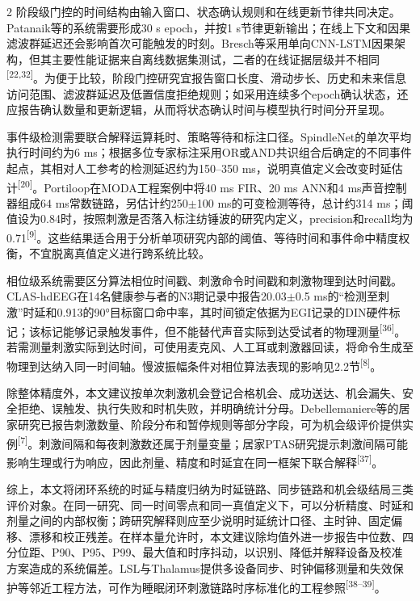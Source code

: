 \documentclass[UTF8,zihao=5,fontset=none]{ctexart}
\newcommand{\refcite}[1]{\nolinebreak[4]\textsuperscript{[#1]}}
\begin{document}
\begin{multicols}{2}
阶段级门控的时间结构由输入窗口、状态确认规则和在线更新节律共同决定。Patanaik等的系统需要形成30 s epoch，并按1 s节律更新输出；在线上下文和因果滤波群延迟还会影响首次可能触发的时刻。Bresch等采用单向CNN-LSTM因果架构，但其主要性能证据来自离线数据集测试，二者的在线证据层级并不相同\refcite{22,32}。为便于比较，阶段门控研究宜报告窗口长度、滑动步长、历史和未来信息访问范围、滤波群延迟及低置信度拒绝规则；如采用连续多个epoch确认状态，还应报告确认数量和更新逻辑，从而将状态确认时间与模型执行时间分开呈现。\par

事件级检测需要联合解释运算耗时、策略等待和标注口径。SpindleNet的单次平均执行时间约为6 ms；根据多位专家标注采用OR或AND共识组合后确定的不同事件起点，其相对人工参考的检测延迟约为150--350 ms，说明真值定义会改变时延估计\refcite{20}。Portiloop在MODA工程案例中将40 ms FIR、20 ms ANN和4 ms声音控制器组成64 ms常数链路，另估计约250$\pm$100 ms的可变检测等待，总计约314 ms；阈值设为0.84时，按照刺激是否落入标注纺锤波的研究内定义，precision和recall均为0.71\refcite{9}。这些结果适合用于分析单项研究内部的阈值、等待时间和事件命中精度权衡，不宜脱离真值定义进行跨系统比较。\par

相位级系统需要区分算法相位时间戳、刺激命令时间戳和刺激物理到达时间戳。CLAS-hdEEG在14名健康参与者的N3期记录中报告20.03$\pm$0.5 ms的“检测至刺激”时延和0.913的90°目标窗口命中率，其时间锁定依据为EGI记录的DIN硬件标记；该标记能够记录触发事件，但不能替代声音实际到达受试者的物理测量\refcite{36}。若需测量刺激实际到达时间，可使用麦克风、人工耳或刺激器回读，将命令生成至物理到达纳入同一时间轴。慢波振幅条件对相位算法表现的影响见2.2节\refcite{8}。\par

除整体精度外，本文建议按单次刺激机会登记合格机会、成功送达、机会漏失、安全拒绝、误触发、执行失败和时机失败，并明确统计分母。Debellemaniere等的居家研究已报告刺激数量、阶段分布和暂停规则等部分字段，可为机会级评价提供实例\refcite{7}。刺激间隔和每夜刺激数还属于剂量变量；居家PTAS研究提示刺激间隔可能影响生理或行为响应，因此剂量、精度和时延宜在同一框架下联合解释\refcite{37}。\par

综上，本文将闭环系统的时延与精度归纳为时延链路、同步链路和机会级结局三类评价对象。在同一研究、同一时间零点和同一真值定义下，可以分析精度、时延和剂量之间的内部权衡；跨研究解释则应至少说明时延统计口径、主时钟、固定偏移、漂移和校正残差。在样本量允许时，本文建议除均值外进一步报告中位数、四分位距、P90、P95、P99、最大值和时序抖动，以识别、降低并解释设备及校准方案造成的系统偏差。LSL与Thalamus提供多设备同步、时钟偏移测量和失效保护等邻近工程方法，可作为睡眠闭环刺激链路时序标准化的工程参照\refcite{38--39}。\par


\end{multicols}
\end{document}
